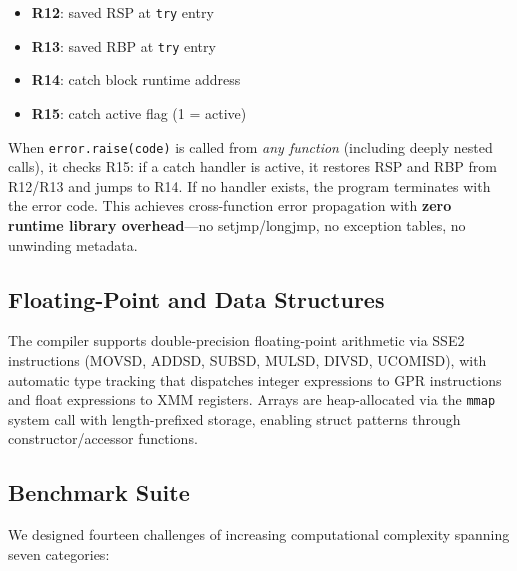 \documentclass[11pt,a4paper]{article}
\begin{document}
\begin{itemize}
    \item \textbf{R12}: saved RSP at \texttt{try} entry
    \item \textbf{R13}: saved RBP at \texttt{try} entry
    \item \textbf{R14}: catch block runtime address
    \item \textbf{R15}: catch active flag (1 = active)
\end{itemize}

When \texttt{error.raise(code)} is called from \emph{any function} (including deeply nested calls), it checks R15: if a catch handler is active, it restores RSP and RBP from R12/R13 and jumps to R14. If no handler exists, the program terminates with the error code. This achieves cross-function error propagation with \textbf{zero runtime library overhead}---no setjmp/longjmp, no exception tables, no unwinding metadata.

\subsection{Floating-Point and Data Structures}

The compiler supports double-precision floating-point arithmetic via SSE2 instructions (MOVSD, ADDSD, SUBSD, MULSD, DIVSD, UCOMISD), with automatic type tracking that dispatches integer expressions to GPR instructions and float expressions to XMM registers. Arrays are heap-allocated via the \texttt{mmap} system call with length-prefixed storage, enabling struct patterns through constructor/accessor functions.

\subsection{Benchmark Suite}

We designed fourteen challenges of increasing computational complexity spanning seven categories:
\end{document}
